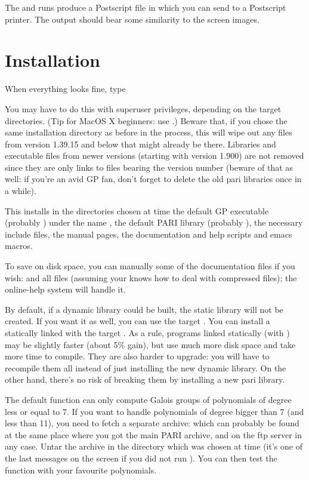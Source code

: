 The  and  runs produce a Postscript
file  in  which you can send to a Postscript
printer. The output should bear some similarity to the screen images.

\section{Installation} When everything looks fine, type


\noindent You may have to do this with superuser privileges, depending on
the target directories. (Tip for MacOS X beginners: use
.) Beware that, if you chose the same installation
directory as before in the  process, this will wipe out any
files from version 1.39.15 and below that might already be there. Libraries
and executable files from newer versions (starting with version 1.900) are
not removed since they are only links to files bearing the version number
(beware of that as well: if you're an avid GP fan, don't forget to delete the
old pari libraries once in a while).

This installs in the directories chosen at  time the default
GP executable (probably ) under the name , the default
PARI library (probably ), the necessary include files, the
manual pages, the documentation and help scripts and emacs macros.

To save on disk space, you can manually  some of the documentation
files if you wish:  and all  files (assuming your
 knows how to deal with compressed files); the online-help system
will handle it.

By default, if a dynamic library  could be built, the static
library  will not be created. If you want it as well, you can
use the target . You can install a statically
linked  with the target . As a rule,
programs linked statically (with ) may be slightly faster
(about 5\% gain), but use much more disk space and take more time to compile.
They are also harder to upgrade: you will have to recompile them all instead
of just installing the new dynamic library. On the other hand, there's no
risk of breaking them by installing a new pari library.

 The default  function can only
compute Galois groups of polynomials of degree less or equal to 7. If you
want to handle polynomials of degree bigger than 7 (and less than 11), you
need to fetch a separate archive:  which can probably be
found at the same place where you got the main PARI archive, and on the
 ftp server in any case. Untar the archive in the 
directory which was chosen at  time (it's one of the last
messages on the screen if you did not run ). You can then
test the  function with your favourite polynomials.

